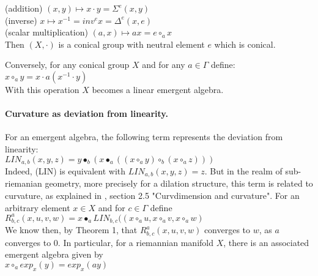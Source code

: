 \documentclass{article}
\begin{document}
(addition) $\displaystyle (x,y) \mapsto  x \cdot y = \Sigma^{e} (x , y)$  \\

(inverse) $\displaystyle x \mapsto x^{-1} = inv^{e} x = \Delta^{e} (x,e)$ \\

(scalar multiplication) $(a,x) \mapsto  a x = e \circ_{a} x$ \\

Then $\displaystyle (X,\cdot)$ is a conical group with neutral element $e$ which is conical. 

Conversely, for any conical group $X$ and for any $a \in \Gamma$ define: \\ 

$\displaystyle x \circ_{a} y =  x \cdot a ( x^{-1} \cdot y)$ \\ 

With this operation $X$ becomes a linear emergent algebra. \\ 

\paragraph{Curvature as deviation from linearity.} For an emergent algebra, the following term represents the deviation from linearity: \\

$\displaystyle LIN_{a,b}(x,y,z) =   y \bullet_{b} (x \bullet_{a} ((x \circ_{a} y) \circ_{b} (x \circ_{a} z)))$ \\

Indeed, (LIN) is equivalent with  $\displaystyle LIN_{a,b}(x,y,z) = z$. But in the realm of sub-riemanian geometry, more precisely for a dilation structure, this term is related to curvature, as explained in \cite{buligasub}, section 2.5 "Curvdimension and curvature". For an arbitrary element $x \in X$ and for $c \in \Gamma$ define \\

$\displaystyle R^{a}_{b,c}(x,u,v,w) = x \bullet_{a} LIN_{b,c} ((x \circ_{a} u, x \circ_{a} v, x \circ_{a} w) $\\

We know then, by Theorem 1, that $\displaystyle R^{a}_{b,c}(x,u,v,w)$ converges to $w$, as $a$ converges to $0$. In particular, for a riemannian manifold $X$, there is an associated emergent algebra given by \\

$\displaystyle x \circ_{a} exp_{x}(y) = exp_{x}(ay)$ \\
\end{document}
